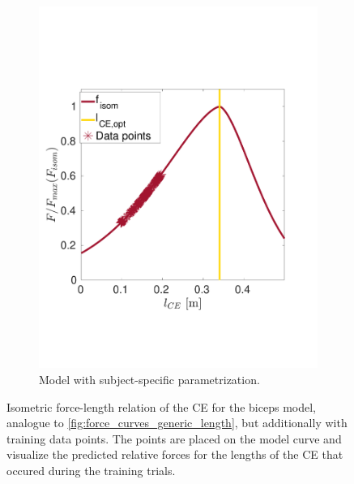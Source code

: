 \begin{figure}
  \quad
  \begin{subfigure}[t]{0.47\textwidth}%
    \centering%
    \includegraphics[width=\textwidth]{images/summer_school_study/biceps_optimized.pdf}%
    \caption{Model with subject-specific parametrization.}%
    \label{fig:biceps_b}%
  \end{subfigure}%
  \caption{Isometric force-length relation of the CE for the biceps model, analogue to \cref{fig:force_curves_generic_length}, but additionally with training data points. The points are placed on the model curve and visualize the predicted relative forces for the lengths of the CE that occured during the training trials.}%
  \label{fig:biceps_working_area}%
\end{figure}%


